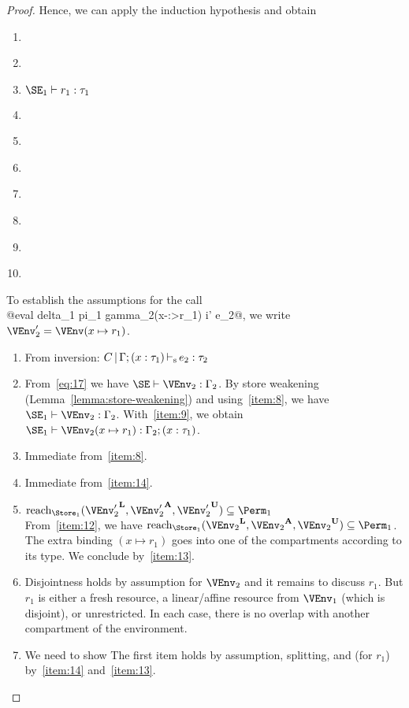 \begin{proof}
  Hence, we can apply the induction hypothesis and obtain
  \begin{enumerate}[({R1-}1)]
  \item {}
  \item\label{item:8} 
  \item\label{item:9} $\SE_1 \vdash r_1 : \tau_1$
  \item\label{item:14} 
  \item\label{item:13} 
  \item\label{item:16} 
  \item\label{item:24} 
  \item\label{item:26} 
  \item\label{item:30} 
  \item\label{item:10} 
  \end{enumerate}
  To establish the assumptions for the call \\
  @eval delta_1 pi_1 gamma_2(x-:>r_1) i' e_2@,
  we write $\VEnv_2' = \VEnv (x \mapsto r_1)$.
  \begin{enumerate}[({A2-}1)]
  \item From inversion: $C \operatorname{|} \Gamma;(x : \tau_1) \operatorname{\vdash_s} e_2 : \tau_2$
  \item From~\eqref{eq:17} we have $\SE \vdash \VEnv_2 : \E_2$.
    By store weakening (Lemma~\ref{lemma:store-weakening}) and
    using~\ref{item:8}, we have
    $\SE_1 \vdash \VEnv_2 : \E_2$.
    With~\ref{item:9}, we obtain
    $\SE_1 \vdash \VEnv_2 (x \mapsto r_1 ) : \E_2;\bvar x {\tau_1}$.
  \item Immediate from~\ref{item:8}.
  \item Immediate from~\ref{item:14}.
  \item $\Reach{\Store_1}{\Active{\VEnv_2'}, \MutableBorrows{\VEnv_2'},
      \ImmutableBorrows{\VEnv_2'}} \subseteq \Perm_1$ \\
    From~\ref{item:12}, we have
     $\Reach{\Store_1}{\Active{\VEnv_2}, \MutableBorrows{\VEnv_2},
      \ImmutableBorrows{\VEnv_2}} \subseteq \Perm_1$. The extra
    binding $(x \mapsto r_1)$ goes into one of the compartments
    according to its type. We conclude by~\ref{item:13}.
  \item Disjointness holds by assumption for $\VEnv_2$ and it remains
    to discuss $r_1$. But $r_1$ is either a fresh resource, a
    linear/affine resource from $\VEnv_1$ (which is disjoint), or
    unrestricted. In each case, there is no overlap with another
    compartment of the environment.
  \item We need to show
    The first item holds by assumption, splitting, and (for $r_1$)
    by~\ref{item:14} and~\ref{item:13}.


\end{enumerate}
\end{proof}
